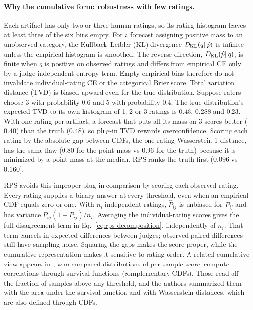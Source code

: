 \paragraph{Why the cumulative form: robustness with few ratings.}
Each artifact has only two or three human ratings, so its rating histogram leaves at least three of the six bins empty.
For a forecast assigning positive mass to an unobserved category, the Kullback--Leibler (KL) divergence $D_{\mathrm{KL}}(q\|\hat p)$ is infinite unless the empirical histogram is smoothed.
The reverse direction, $D_{\mathrm{KL}}(\hat p\|q)$, is finite when $q$ is positive on observed ratings and differs from empirical CE only by a judge-independent entropy term.
Empty empirical bins therefore do not invalidate individual-rating CE or the categorical Brier score.
Total variation distance (TVD) is biased upward even for the true distribution.
Suppose raters choose 3 with probability $0.6$ and 5 with probability $0.4$.
The true distribution's expected TVD to its own histogram of 1, 2 or 3 ratings is $0.48$, $0.288$ and $0.23$.
With one rating per artifact, a forecast that puts all its mass on 3 scores better ($0.40$) than the truth ($0.48$), so plug-in TVD rewards overconfidence.
Scoring each rating by the absolute gap between CDFs, the one-rating Wasserstein-1 distance, has the same flaw ($0.80$ for the point mass vs $0.96$ for the truth) because it is minimized by a point mass at the median.
RPS ranks the truth first ($0.096$ vs $0.160$).

RPS avoids this improper plug-in comparison by scoring each observed rating.
Every rating supplies a binary answer at every threshold, even when an empirical CDF equals zero or one.
With $n_i$ independent ratings, $\hat P_{ij}$ is unbiased for $P_{ij}$ and has variance $P_{ij}(1-P_{ij})/n_i$.
Averaging the individual-rating scores gives the full disagreement term in Eq.~\ref{eq:rps-decomposition}, independently of $n_i$.
That term cancels in expected differences between judges; observed paired differences still have sampling noise.
Squaring the gaps makes the score proper, while the cumulative representation makes it sensitive to rating order.
A related cumulative view appears in \citet{schaeffer2024elusive}, who compared distributions of per-sample score--compute correlations through survival functions (complementary CDFs).
Those read off the fraction of samples above any threshold, and the authors summarized them with the area under the survival function and with Wasserstein distances, which are also defined through CDFs.

